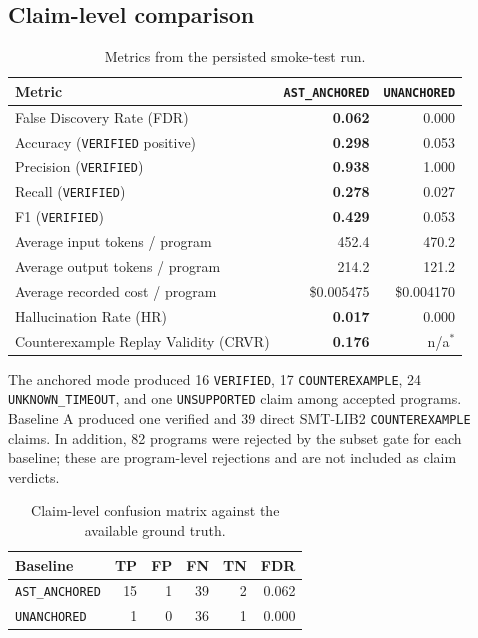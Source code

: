 \documentclass[11pt]{article}
\newcommand{\anchored}{\texttt{AST\_ANCHORED}}
\newcommand{\unanchored}{\texttt{UNANCHORED}}
\begin{document}
\subsection{Claim-level comparison}

\begin{table}[ht]
\centering
\small
\caption{Metrics from the persisted smoke-test run.}
\label{tab:metrics}
\begin{tabularx}{\textwidth}{@{}Yrr@{}}
\toprule
Metric & \anchored & \unanchored \\
\midrule
False Discovery Rate (FDR) & \textbf{0.062} & 0.000 \\
Accuracy (\texttt{VERIFIED} positive) & \textbf{0.298} & 0.053 \\
Precision (\texttt{VERIFIED}) & \textbf{0.938} & 1.000 \\
Recall (\texttt{VERIFIED}) & \textbf{0.278} & 0.027 \\
F1 (\texttt{VERIFIED}) & \textbf{0.429} & 0.053 \\
Average input tokens / program & 452.4 & 470.2 \\
Average output tokens / program & 214.2 & 121.2 \\
Average recorded cost / program & \$0.005475 & \$0.004170 \\
Hallucination Rate (HR) & \textbf{0.017} & 0.000 \\
Counterexample Replay Validity (CRVR) & \textbf{0.176} & n/a$^{*}$ \\
\bottomrule
\end{tabularx}
\end{table}

The anchored mode produced 16 \texttt{VERIFIED}, 17
\texttt{COUNTEREXAMPLE}, 24 \texttt{UNKNOWN\_TIMEOUT}, and one
\texttt{UNSUPPORTED} claim among accepted programs.  Baseline A produced one
verified and 39 direct SMT-LIB2 \texttt{COUNTEREXAMPLE} claims.  In addition,
82 programs were rejected by the subset
gate for each baseline; these are program-level rejections and are not
included as claim verdicts.

\begin{table}[ht]
\centering
\small
\caption{Claim-level confusion matrix against the available ground truth.}
\label{tab:matrix}
\begin{tabular}{@{}lrrrrr@{}}
\toprule
Baseline & TP & FP & FN & TN & FDR \\
\midrule
\anchored & 15 & 1 & 39 & 2 & 0.062 \\
\unanchored & 1 & 0 & 36 & 1 & 0.000 \\
\bottomrule
\end{tabular}
\end{table}
\end{document}
